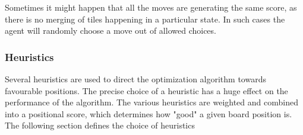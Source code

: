 \documentclass{svproc}
\begin{document}
    Sometimes it might happen that all the moves are generating the same score, as there is no merging of tiles happening in a particular state. In such cases the agent will randomly choose a move out of allowed choices.

    \subsubsection{Heuristics}

    Several heuristics are used to direct the optimization algorithm towards favourable positions. The precise choice of a heuristic has a huge effect on the performance of the algorithm. The various heuristics are weighted and combined into a positional score, which determines how "good" a given board position is. The following section defines the choice of heuristics
\end{document}
